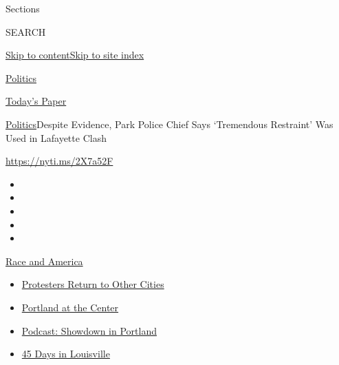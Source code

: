 Sections

SEARCH

\protect\hyperlink{site-content}{Skip to
content}\protect\hyperlink{site-index}{Skip to site index}

\href{https://www.nytimes.com/section/politics}{Politics}

\href{https://myaccount.nytimes.com/auth/login?response_type=cookie\&client_id=vi}{}

\href{https://www.nytimes.com/section/todayspaper}{Today's Paper}

\href{/section/politics}{Politics}\textbar{}Despite Evidence, Park
Police Chief Says `Tremendous Restraint' Was Used in Lafayette Clash

\url{https://nyti.ms/2X7a52F}

\begin{itemize}
\item
\item
\item
\item
\item
\end{itemize}

\href{https://www.nytimes.com/news-event/george-floyd-protests-minneapolis-new-york-los-angeles?action=click\&pgtype=Article\&state=default\&region=TOP_BANNER\&context=storylines_menu}{Race
and America}

\begin{itemize}
\tightlist
\item
  \href{https://www.nytimes.com/2020/07/26/us/protests-portland-seattle-trump.html?action=click\&pgtype=Article\&state=default\&region=TOP_BANNER\&context=storylines_menu}{Protesters
  Return to Other Cities}
\item
  \href{https://www.nytimes.com/2020/07/24/us/portland-oregon-protests-white-race.html?action=click\&pgtype=Article\&state=default\&region=TOP_BANNER\&context=storylines_menu}{Portland
  at the Center}
\item
  \href{https://www.nytimes.com/2020/07/23/podcasts/the-daily/portland-protests.html?action=click\&pgtype=Article\&state=default\&region=TOP_BANNER\&context=storylines_menu}{Podcast:
  Showdown in Portland}
\item
  \href{https://www.nytimes.com/interactive/2020/07/16/us/black-lives-matter-protests-louisville-breonna-taylor.html?action=click\&pgtype=Article\&state=default\&region=TOP_BANNER\&context=storylines_menu}{45
  Days in Louisville}
\end{itemize}

